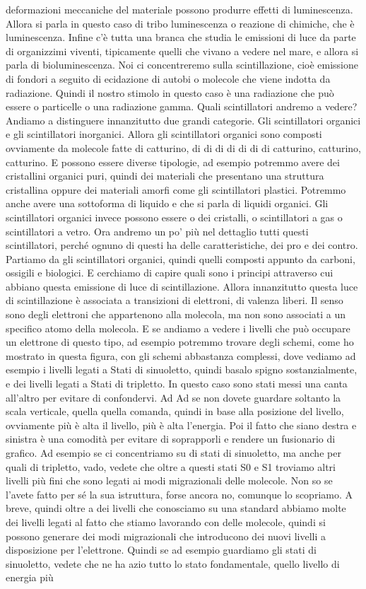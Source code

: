 deformazioni meccaniche del materiale possono produrre effetti di luminescenza. Allora si parla in questo caso di tribo luminescenza o reazione di chimiche, che è luminescenza. Infine c'è tutta una branca che studia le emissioni di luce da parte di organizzimi viventi, tipicamente quelli che vivano a vedere nel mare, e allora si parla di bioluminescenza. Noi ci concentreremo sulla scintillazione, cioè emissione di fondori a seguito di ecidazione di autobi o molecole che viene indotta da radiazione. Quindi il nostro stimolo in questo caso è una radiazione che può essere o particelle o una radiazione gamma. Quali scintillatori andremo a vedere? Andiamo a distinguere innanzitutto due grandi categorie. Gli scintillatori organici e gli scintillatori inorganici. Allora gli scintillatori organici sono composti ovviamente da molecole fatte di catturino, di di di di di di di catturino, catturino, catturino. E possono essere diverse tipologie, ad esempio potremmo avere dei cristallini organici puri, quindi dei materiali che presentano una struttura cristallina oppure dei materiali amorfi come gli scintillatori plastici. Potremmo anche avere una sottoforma di liquido e che si parla di liquidi organici. Gli scintillatori organici invece possono essere o dei cristalli, o scintillatori a gas o scintillatori a vetro. Ora andremo un po' più nel dettaglio tutti questi scintillatori, perché ognuno di questi ha delle caratteristiche, dei pro e dei contro. Partiamo da gli scintillatori organici, quindi quelli composti appunto da carboni, ossigili e biologici. E cerchiamo di capire quali sono i principi attraverso cui abbiano questa emissione di luce di scintillazione. Allora innanzitutto questa luce di scintillazione è associata a transizioni di elettroni, di valenza liberi. Il senso sono degli elettroni che appartenono alla molecola, ma non sono associati a un specifico atomo della molecola. E se andiamo a vedere i livelli che può occupare un elettrone di questo tipo, ad esempio potremmo trovare degli schemi, come ho mostrato in questa figura, con gli schemi abbastanza complessi, dove vediamo ad esempio i livelli legati a Stati di sinuoletto, quindi basalo spigno sostanzialmente, e dei livelli legati a Stati di tripletto. In questo caso sono stati messi una canta all'altro per evitare di confondervi. Ad Ad se non dovete guardare soltanto la scala verticale, quella quella comanda, quindi in base alla posizione del livello, ovviamente più è alta il livello, più è alta l'energia. Poi il fatto che siano destra e sinistra è una comodità per evitare di soprapporli e rendere un fusionario di grafico. Ad esempio se ci concentriamo su di stati di sinuoletto, ma anche per quali di tripletto, vado, vedete che oltre a questi stati S0 e S1 troviamo altri livelli più fini che sono legati ai modi migrazionali delle molecole. Non so se l'avete fatto per sé la sua istruttura, forse ancora no, comunque lo scopriamo. A breve, quindi oltre a dei livelli che conosciamo su una standard abbiamo molte dei livelli legati al fatto che stiamo lavorando con delle molecole, quindi si possono generare dei modi migrazionali che introducono dei nuovi livelli a disposizione per l'elettrone. Quindi se ad esempio guardiamo gli stati di sinuoletto, vedete che ne ha azio tutto lo stato fondamentale, quello livello di energia più 